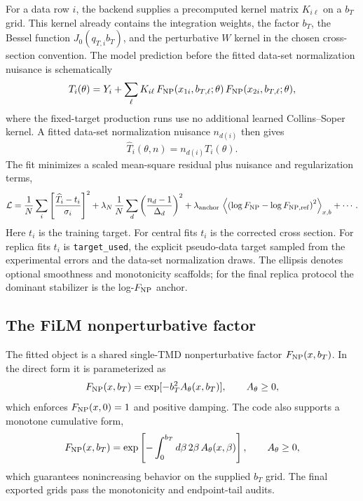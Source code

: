 \documentclass[11pt]{article}
\newcommand{\bt}{b_T}
\newcommand{\FNP}{F_{\rm NP}}
\newcommand{\code}[1]{\texttt{#1}}
\begin{document}
For a data row $i$, the backend supplies a precomputed kernel matrix $K_{i\ell}$ on a $\bt$ grid.  This kernel already contains the integration weights, the factor $\bt$, the Bessel function $J_0(q_{T,i}\bt)$, and the perturbative $W$ kernel in the chosen cross-section convention.  The model prediction before the fitted data-set normalization nuisance is schematically
\begin{equation}
  T_i(\theta)
  =
  Y_i
  +
  \sum_\ell K_{i\ell}\,
  \FNP(x_{1i},b_{T,\ell};\theta)\,
  \FNP(x_{2i},b_{T,\ell};\theta),
\end{equation}
where the fixed-target production runs use no additional learned Collins--Soper kernel.  A fitted data-set normalization nuisance $n_{d(i)}$ then gives
\begin{equation}
  \widehat T_i(\theta,n)=n_{d(i)}T_i(\theta).
\end{equation}
The fit minimizes a scaled mean-square residual plus nuisance and regularization terms,
\begin{equation}
\label{eq:loss}
  {\cal L}
  =
  \frac{1}{N}\sum_i
  \left[\frac{\widehat T_i-t_i}{\sigma_i}\right]^2
  +
  \lambda_N\,\frac{1}{N}\sum_d
  \left(\frac{n_d-1}{\Delta_d}\right)^2
  +
  \lambda_{\rm anchor}\,
  \left\langle
    \left(\log\FNP-\log F_{{\rm NP},{\rm ref}}\right)^2
  \right\rangle_{x,b}
  +\cdots .
\end{equation}
Here $t_i$ is the training target.  For central fits $t_i$ is the corrected cross section.  For replica fits $t_i$ is \code{target\_used}, the explicit pseudo-data target sampled from the experimental errors and the data-set normalization draws.  The ellipsis denotes optional smoothness and monotonicity scaffolds; for the final replica protocol the dominant stabilizer is the log-$\FNP$ anchor.

\subsection{The FiLM nonperturbative factor}

The fitted object is a shared single-TMD nonperturbative factor $\FNP(x,\bt)$.  In the direct form it is parameterized as
\begin{equation}
  \FNP(x,\bt)=\exp[-\bt^2 A_\theta(x,\bt)],\qquad A_\theta\ge0,
\end{equation}
which enforces $\FNP(x,0)=1$ and positive damping.  The code also supports a monotone cumulative form,
\begin{equation}
  \FNP(x,\bt)=
  \exp\left[-\int_0^{b_T} d\beta\,2\beta\,A_\theta(x,\beta)\right],
  \qquad A_\theta\ge0,
\end{equation}
which guarantees nonincreasing behavior on the supplied $\bt$ grid.  The final exported grids pass the monotonicity and endpoint-tail audits.
\end{document}
